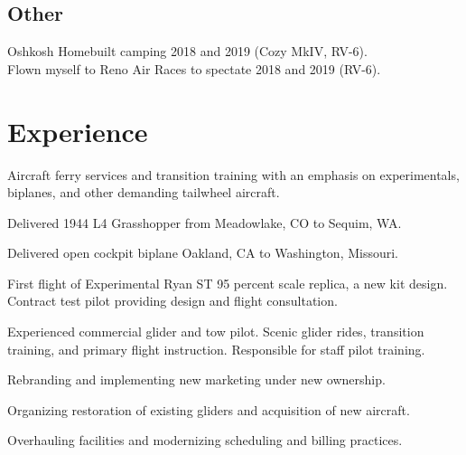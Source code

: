 \documentclass[]{mershon-two-column-resume}
\begin{document}
\begin{minipage}[t]{0.33\textwidth}
		\sectionsep
		
		\subsection{Other}
		Oshkosh Homebuilt camping 2018 and 2019 (Cozy MkIV, RV-6). \\
		Flown myself to Reno Air Races to spectate 2018 and 2019 (RV-6).
				
		
	\end{minipage} 
	\hfill
	\begin{minipage}[t]{0.66\textwidth} 
		
		
		\section{Experience}
		
		\vspace{\topsep} %
		\begin{tightemize}
			\item Aircraft ferry services and transition training with an emphasis on experimentals, biplanes, and other demanding tailwheel aircraft.
			\item Delivered 1944 L4 Grasshopper from Meadowlake, CO to Sequim, WA.
			\item Delivered open cockpit biplane Oakland, CA to Washington, Missouri.
			\item First flight of Experimental Ryan ST 95 percent scale replica, a new kit design. Contract test pilot providing design and flight consultation.
		\end{tightemize}
		\sectionsep
		
		\begin{tightemize}
			\item Experienced commercial glider and tow pilot. Scenic glider rides, transition training, and primary flight instruction. Responsible for staff pilot training.
			\item Rebranding and implementing new marketing under new ownership.
			\item Organizing restoration of existing gliders and acquisition of new aircraft.
			\item Overhauling facilities and modernizing scheduling and billing practices.
		\end{tightemize}
		\sectionsep
		

\end{minipage}
\end{document}
